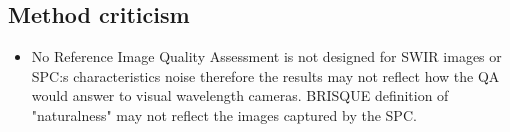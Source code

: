 \pagebreak



\subsection{Method criticism}
\begin{itemize}
    \item No Reference Image Quality Assessment is not designed for SWIR images or SPC:s characteristics noise therefore the results may not reflect how the QA would answer to visual wavelength cameras. BRISQUE definition of "naturalness" may not reflect the images captured by the SPC. 
\end{itemize}

